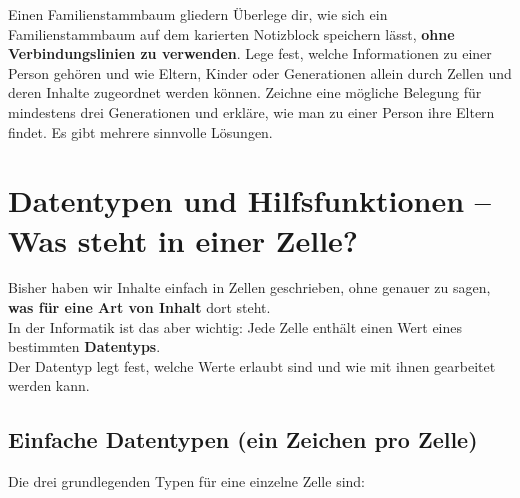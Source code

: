 \documentclass{article}
\begin{document}
\begin{uebung}{Einen Familienstammbaum gliedern}
Überlege dir, wie sich ein Familienstammbaum auf dem karierten Notizblock speichern lässt, \textbf{ohne Verbindungslinien zu verwenden}. Lege fest, welche Informationen zu einer Person gehören und wie Eltern, Kinder oder Generationen allein durch Zellen und deren Inhalte zugeordnet werden können. Zeichne eine mögliche Belegung für mindestens drei Generationen und erkläre, wie man zu einer Person ihre Eltern findet. Es gibt mehrere sinnvolle Lösungen.
\end{uebung}


      
    

    

    
      
        \section{Datentypen und Hilfsfunktionen – Was steht in einer Zelle?}
        
Bisher haben wir Inhalte einfach in Zellen geschrieben, ohne genauer zu sagen, \textbf{was für eine Art von Inhalt} dort steht.\\
          In der Informatik ist das aber wichtig: Jede Zelle enthält einen Wert eines bestimmten \textbf{Datentyps}.\\
          Der Datentyp legt fest, welche Werte erlaubt sind und wie mit ihnen gearbeitet werden kann.


        \subsection{Einfache Datentypen (ein Zeichen pro Zelle)}

        
Die drei grundlegenden Typen für eine einzelne Zelle sind:
\end{document}
